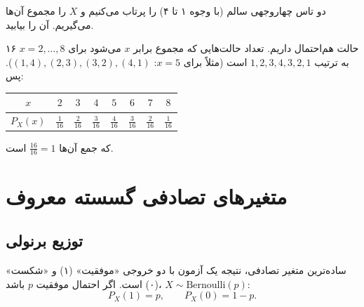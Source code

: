 \begin{example}
دو تاس چهاروجهی سالم (با وجوه ۱ تا ۴) را پرتاب می‌کنیم و $X$ را مجموع آن‌ها می‌گیریم.  آن را بیابید.
\begin{solution}
۱۶ حالت هم‌احتمال داریم. تعداد حالت‌هایی که مجموع برابر $x$ می‌شود برای $x=2,\ldots,8$ به ترتیب $1,2,3,4,3,2,1$ است (مثلاً برای $x=5$: $(1,4),(2,3),(3,2),(4,1)$). پس:
\begin{center}
\renewcommand{\arraystretch}{1.3}
\begin{tabular}{c|ccccccc}
$x$ & $2$ & $3$ & $4$ & $5$ & $6$ & $7$ & $8$\\\hline
$P_X(x)$ & $\frac1{16}$ & $\frac2{16}$ & $\frac3{16}$ & $\frac4{16}$ & $\frac3{16}$ & $\frac2{16}$ & $\frac1{16}$
\end{tabular}
\end{center}
که جمع آن‌ها $\frac{16}{16}=1$ است.
\end{solution}
\end{example}

\begin{center}
\hspace{5mm}
\end{center}

\section{متغیرهای تصادفی گسسته معروف}

\subsection{توزیع برنولی }
ساده‌ترین متغیر تصادفی، نتیجه یک آزمون با دو خروجی «موفقیت» (۱) و «شکست» (۰) است. اگر احتمال موفقیت $p$ باشد، $X\sim\mathrm{Bernoulli}(p)$:
\[
P_X(1)=p,\qquad P_X(0)=1-p .
\]

